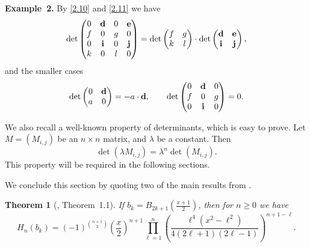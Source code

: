 \documentclass{amsart}
\theoremstyle{plain}
\newtheorem{theorem}{Theorem}[section]
\numberwithin{equation}{section}
\begin{document}
\bigskip
\noindent
{\bf Example~2.} By \eqref{2.10} and \eqref{2.11} we have
\[
\det\begin{pmatrix}0 & {\bf d} & 0 & {\bf e}\\
f & 0 & g & 0\\
0 & {\bf i} & 0 & {\bf j}\\
k & 0 & l & 0
\end{pmatrix}=\det\begin{pmatrix}f & g\\
k & l
\end{pmatrix}\cdot\det\begin{pmatrix}{\bf d} & {\bf e}\\
{\bf i} & {\bf j}
\end{pmatrix},
\]
and the smaller cases
\[
\det\begin{pmatrix}0 & {\bf d}\\
a & 0
\end{pmatrix}=-a\cdot{\bf d},
\qquad
\det\begin{pmatrix}0 & {\bf d} & 0\\
f & 0 & g\\
0 & {\bf i} & 0
\end{pmatrix}=0.
\]

We also recall a well-known property of determinants, which
is easy to prove. Let $M=\left(M_{i,j}\right)$ be an $n\times n$ matrix,
and $\lambda$ be a constant. Then
\begin{equation}\label{2.12}
\det(\lambda M_{i,j})
= \lambda^n\det(M_{i,j}).
\end{equation}
This property will be required in the following sections.

We conclude this section by quoting two of the main results from \cite{DJ}.

\begin{theorem}[\cite{DJ}, Theorem~1.1]\label{thm:2.3}
If $b_k=B_{2k+1}(\frac{x+1}{2})$, then for $n\geq 0$ we have
\begin{equation}\label{2.13}
H_n(b_k) = (-1)^{\binom{n+1}{2}}\left(\frac{x}{2}\right)^{n+1}\prod_{\ell=1}^{n}
\left(\frac{\ell^{4}(x^{2}-\ell^{2})}{4(2\ell+1)(2\ell-1)}\right)^{n+1-\ell}.
\end{equation}
\end{theorem}
\end{document}
